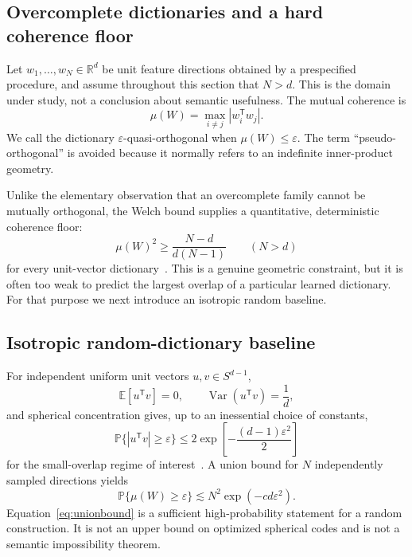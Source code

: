 \documentclass[
  aps,
  reprint,
  superscriptaddress,
  floatfix,
  nofootinbib,
  longbibliography
]{revtex4-2}
\newcommand{\R}{\mathbb{R}}
\newcommand{\E}{\mathbb{E}}
\newcommand{\Prob}{\mathbb{P}}
\newcommand{\Sph}[1]{S^{#1}}
\newcommand{\Nsem}{N}
\newcommand{\T}{^{\mathsf{T}}}
\DeclareMathOperator{\Var}{Var}
\begin{document}
\subsection{Overcomplete dictionaries and a hard coherence floor}
\label{sec:quasiortho}

Let $w_1,\dots,w_{\Nsem}\in\R^d$ be unit feature directions obtained by a
prespecified procedure, and assume throughout this section that $\Nsem>d$.
This is the domain under study, not a conclusion about semantic usefulness.
The mutual coherence is
%
\begin{equation}
\label{eq:quasiortho}
\mu(W)=\max_{i\ne j}|w_i\T w_j|.
\end{equation}
%
We call the dictionary $\varepsilon$-quasi-orthogonal when
$\mu(W)\le\varepsilon$.  The term ``pseudo-orthogonal'' is avoided because it
normally refers to an indefinite inner-product geometry.

Unlike the elementary observation that an overcomplete family cannot be
mutually orthogonal, the Welch bound supplies a quantitative, deterministic
coherence floor:
%
\begin{equation}
\label{eq:welch}
\mu(W)^2\ge
\frac{\Nsem-d}{d(\Nsem-1)}
\qquad (\Nsem>d)
\end{equation}
%
for every unit-vector dictionary~\cite{welch1974coherence}.  This is a genuine
geometric constraint, but it is often too weak to predict the largest overlap
of a particular learned dictionary.  For that purpose we next introduce an
isotropic random baseline.

\subsection{Isotropic random-dictionary baseline}
\label{sec:levy}

For independent uniform unit vectors $u,v\in\Sph{d-1}$,
%
\begin{equation}
\label{eq:moments}
\E[u\T v]=0,
\qquad
\Var(u\T v)=\frac{1}{d},
\end{equation}
%
and spherical concentration gives, up to an inessential choice of constants,
%
\begin{equation}
\label{eq:overlap}
\Prob\{|u\T v|\ge\varepsilon\}
\le 2\exp\!\left[-\frac{(d-1)\varepsilon^2}{2}\right]
\end{equation}
%
for the small-overlap regime of interest~\cite{ledoux2001concentration,milman1986asymptotic}.
A union bound for $\Nsem$ independently sampled directions yields
%
\begin{equation}
\label{eq:unionbound}
\Prob\{\mu(W)\ge\varepsilon\}
\lesssim
\Nsem^2\exp(-c d\varepsilon^2).
\end{equation}
%
Equation~\eqref{eq:unionbound} is a sufficient high-probability statement for
a random construction.  It is not an upper bound on optimized spherical codes
and is not a semantic impossibility theorem.
\end{document}
